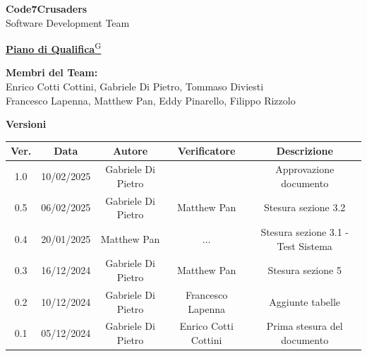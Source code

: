 \documentclass{article}
\begin{document}
\begin{titlepage}
    {\Huge \textbf{Code7Crusaders}}\\
    \vspace{0.5cm}
    {\Large Software Development Team}\\
    \vspace{2cm}
    
    {\large \href{https://code7crusaders.github.io/docs/RTB/documentazione_interna/glossario.html#piano-di-progetto}{\textbf{Piano di Qualifica}\textsuperscript{G}}}\\
    \vspace{5cm}
    
    
    \textbf{Membri del Team:}\\
    Enrico Cotti Cottini, Gabriele Di Pietro, Tommaso Diviesti \\
    Francesco Lapenna, Matthew Pan, Eddy Pinarello, Filippo Rizzolo \\
    \vspace{0.5cm}
    
    \vspace{1cm}
\end{titlepage}



\begin{table}[h!]
\centering
\textbf{Versioni} \\ %
\vspace{2mm} %
\begin{tabular}{|c|c|c|c|c|}
    \hline
    \textbf{Ver.} & \textbf{Data} & \textbf{Autore} & \textbf{Verificatore} & \textbf{Descrizione} \\
    \hline
    1.0 & 10/02/2025 & Gabriele Di Pietro &  & Approvazione documento \\
    0.5 & 06/02/2025 & Gabriele Di Pietro & Matthew Pan & Stesura sezione 3.2 \\
    0.4 & 20/01/2025 & Matthew Pan & ... & Stesura sezione 3.1 - Test Sistema \\
    0.3 & 16/12/2024 & Gabriele Di Pietro & Matthew Pan & Stesura sezione 5 \\
    0.2 & 10/12/2024 & Gabriele Di Pietro & Francesco Lapenna & Aggiunte tabelle \\
    0.1 & 05/12/2024 & Gabriele Di Pietro & Enrico Cotti Cottini & Prima stesura del documento \\  
    \hline
\end{tabular}
\label{tab:versioni}
\end{table}
\newpage
\end{document}
